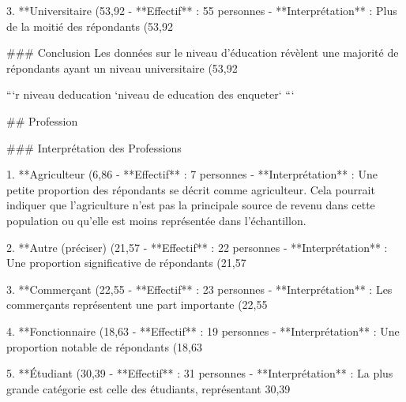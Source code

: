 3. **Universitaire (53,92%
   - **Effectif** : 55 personnes
   - **Interprétation** : Plus de la moitié des répondants (53,92%

### Conclusion
Les données sur le niveau d'éducation révèlent une majorité de répondants ayant un niveau universitaire (53,92%


```{r niveau deducation}
`niveau de education des enqueter`
```

## Profession

### Interprétation des Professions

1. **Agriculteur (6,86%
   - **Effectif** : 7 personnes
   - **Interprétation** : Une petite proportion des répondants se décrit comme agriculteur. Cela pourrait indiquer que l'agriculture n'est pas la principale source de revenu dans cette population ou qu'elle est moins représentée dans l'échantillon.

2. **Autre (préciser) (21,57%
   - **Effectif** : 22 personnes
   - **Interprétation** : Une proportion significative de répondants (21,57%

3. **Commerçant (22,55%
   - **Effectif** : 23 personnes
   - **Interprétation** : Les commerçants représentent une part importante (22,55%

4. **Fonctionnaire (18,63%
   - **Effectif** : 19 personnes
   - **Interprétation** : Une proportion notable de répondants (18,63%

5. **Étudiant (30,39%
   - **Effectif** : 31 personnes
   - **Interprétation** : La plus grande catégorie est celle des étudiants, représentant 30,39%

